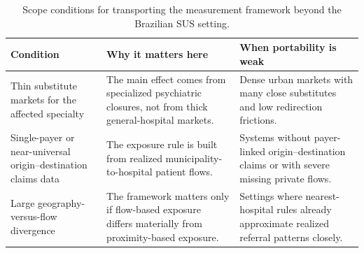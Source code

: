 \begin{table}[h!]
\centering
\caption{Scope conditions for transporting the measurement framework beyond the Brazilian SUS setting.}
\label{tab:scope-conditions}
\small
\begin{tabular}{p{}p{}p{}}
\toprule
Condition & Why it matters here & When portability is weak \\
\midrule
Thin substitute markets for the affected specialty & The main effect comes from specialized psychiatric closures, not from thick general-hospital markets. & Dense urban markets with many close substitutes and low redirection frictions. \\
Single-payer or near-universal origin--destination claims data & The exposure rule is built from realized municipality-to-hospital patient flows. & Systems without payer-linked origin--destination claims or with severe missing private flows. \\
Large geography-versus-flow divergence & The framework matters only if flow-based exposure differs materially from proximity-based exposure. & Settings where nearest-hospital rules already approximate realized referral patterns closely. \\
\bottomrule
\end{tabular}
\end{table}
